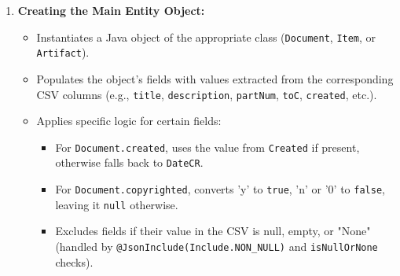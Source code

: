 \documentclass[11pt, a4paper]{article}
\begin{document}
\begin{enumerate}
    \item \textbf{Creating the Main Entity Object:}
        \begin{itemize}
            \item Instantiates a Java object of the appropriate class (\texttt{Document}, \texttt{Item}, or \texttt{Artifact}).
            \item Populates the object's fields with values extracted from the corresponding CSV columns (e.g., \texttt{title}, \texttt{description}, \texttt{partNum}, \texttt{toC}, \texttt{created}, etc.).
            \item Applies specific logic for certain fields:
                \begin{itemize}
                    \item For \texttt{Document.created}, uses the value from \texttt{Created} if present, otherwise falls back to \texttt{DateCR}.
                    \item For \texttt{Document.copyrighted}, converts 'y' to \texttt{true}, 'n' or '0' to \texttt{false}, leaving it \texttt{null} otherwise.
                    \item Excludes fields if their value in the CSV is null, empty, or "None" (handled by \texttt{@JsonInclude(Include.NON\_NULL)} and \texttt{isNullOrNone} checks).
                \end{itemize}
        \end{itemize}


\end{enumerate}
\end{document}
